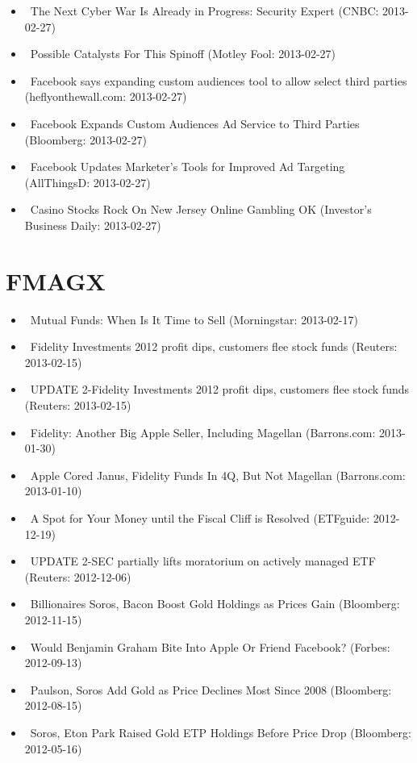 \documentclass[11pt,asymmetric]{article}
\begin{document}
\begin{itemize}
\item\ The Next Cyber War Is Already in Progress: Security Expert (CNBC: 2013-02-27)
\item\ Possible Catalysts For This Spinoff (Motley Fool: 2013-02-27)
\item\ Facebook says expanding custom audiences tool to allow select third parties (heflyonthewall.com: 2013-02-27)
\item\ Facebook Expands Custom Audiences Ad Service to Third Parties (Bloomberg: 2013-02-27)
\item\ Facebook Updates Marketer's Tools for Improved Ad Targeting (AllThingsD: 2013-02-27)
\item\ Casino Stocks Rock On New Jersey Online Gambling OK (Investor's Business Daily: 2013-02-27)
\end{itemize}

\section*{FMAGX}
\begin{itemize}
\item\ Mutual Funds: When Is It Time to Sell (Morningstar: 2013-02-17)
\item\ Fidelity Investments 2012 profit dips, customers flee stock funds (Reuters: 2013-02-15)
\item\ UPDATE 2-Fidelity Investments 2012 profit dips, customers flee stock funds (Reuters: 2013-02-15)
\item\ Fidelity: Another Big Apple Seller, Including Magellan (Barrons.com: 2013-01-30)
\item\ Apple Cored Janus, Fidelity Funds In 4Q, But Not Magellan (Barrons.com: 2013-01-10)
\item\ A Spot for Your Money until the Fiscal Cliff is Resolved (ETFguide: 2012-12-19)
\item\ UPDATE 2-SEC partially lifts moratorium on actively managed ETF (Reuters: 2012-12-06)
\item\ Billionaires Soros, Bacon Boost Gold Holdings as Prices Gain (Bloomberg: 2012-11-15)
\item\ Would Benjamin Graham Bite Into Apple Or Friend Facebook? (Forbes: 2012-09-13)
\item\ Paulson, Soros Add Gold as Price Declines Most Since 2008 (Bloomberg: 2012-08-15)
\item\ Soros, Eton Park Raised Gold ETP Holdings Before Price Drop (Bloomberg: 2012-05-16)
\end{itemize}
\end{document}
